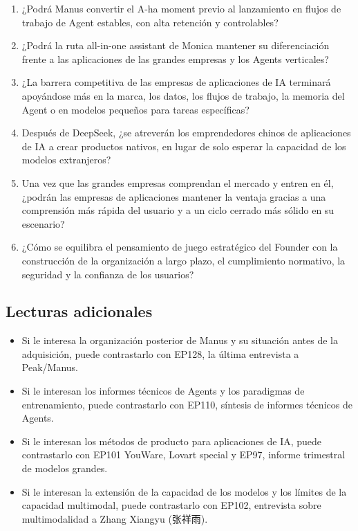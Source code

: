 \begin{enumerate}
\item ¿Podrá Manus convertir el A-ha moment previo al lanzamiento en flujos de trabajo de Agent estables, con alta retención y controlables?
\item ¿Podrá la ruta all-in-one assistant de Monica mantener su diferenciación frente a las aplicaciones de las grandes empresas y los Agents verticales?
\item ¿La barrera competitiva de las empresas de aplicaciones de IA terminará apoyándose más en la marca, los datos, los flujos de trabajo, la memoria del Agent o en modelos pequeños para tareas específicas?
\item Después de DeepSeek, ¿se atreverán los emprendedores chinos de aplicaciones de IA a crear productos nativos, en lugar de solo esperar la capacidad de los modelos extranjeros?
\item Una vez que las grandes empresas comprendan el mercado y entren en él, ¿podrán las empresas de aplicaciones mantener la ventaja gracias a una comprensión más rápida del usuario y a un ciclo cerrado más sólido en su escenario?
\item ¿Cómo se equilibra el pensamiento de juego estratégico del Founder con la construcción de la organización a largo plazo, el cumplimiento normativo, la seguridad y la confianza de los usuarios?
\end{enumerate}

\subsection{Lecturas adicionales}

\begin{itemize}
\item Si le interesa la organización posterior de Manus y su situación antes de la adquisición, puede contrastarlo con EP128, la última entrevista a Peak/Manus.
\item Si le interesan los informes técnicos de Agents y los paradigmas de entrenamiento, puede contrastarlo con EP110, síntesis de informes técnicos de Agents.
\item Si le interesan los métodos de producto para aplicaciones de IA, puede contrastarlo con EP101 YouWare, Lovart special y EP97, informe trimestral de modelos grandes.
\item Si le interesan la extensión de la capacidad de los modelos y los límites de la capacidad multimodal, puede contrastarlo con EP102, entrevista sobre multimodalidad a Zhang Xiangyu (张祥雨).
\end{itemize}


